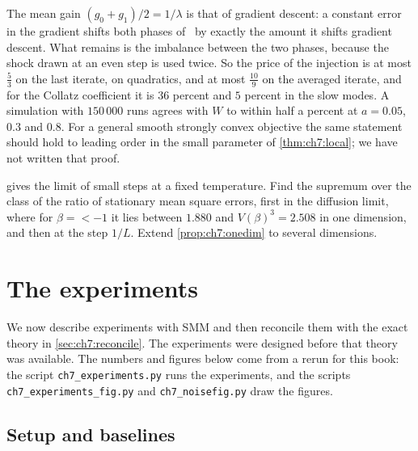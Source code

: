 The mean gain $(g_0+g_1)/2=1/\lambda$ is that of gradient descent: a constant error in the gradient shifts both phases of \smmdet\ by exactly the amount it shifts gradient descent. What remains is the imbalance between the two phases, because the shock drawn at an even step is used twice. So the price of the injection is at most $\tfrac53$ on the last iterate, on quadratics, and at most $\tfrac{10}9$ on the averaged iterate, and for the Collatz coefficient it is $36$ percent and $5$ percent in the slow modes. A simulation with $150\,000$ runs agrees with $W$ to within half a percent at $a=0.05$, $0.3$ and $0.8$. For a general smooth strongly convex objective the same statement should hold to leading order in the small parameter of \cref{thm:ch7:local}; we have not written that proof.

\begin{problem*}\label{prob:ch7:temperature}
 gives the limit of small steps at a fixed temperature. Find the supremum over the class of the ratio of stationary mean square errors, first in the diffusion limit, where for $\beta=\lt-1$ it lies between $1.880$ and $V(\beta)^3=2.508$ in one dimension, and then at the step $1/L$. Extend \cref{prop:ch7:onedim} to several dimensions.
\end{problem*}

\section{The experiments}\label{sec:ch7:experiments}

We now describe experiments with SMM and then reconcile them with the exact theory in \cref{sec:ch7:reconcile}. The experiments were designed before that theory was available. The numbers and figures below come from a rerun for this book: the script \texttt{ch7\_experiments.py} runs the experiments, and the scripts \texttt{ch7\_experiments\_fig.py} and \texttt{ch7\_noisefig.py} draw the figures.

\subsection{Setup and baselines}


